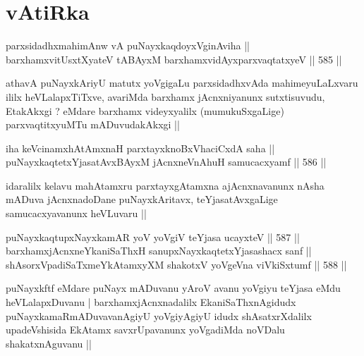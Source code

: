 \section*{vAtiRka}


\begin{shl}
parxsidadhxmahimAnw vA puNayxkaqdoyxVginAviha || \\
barxhamxvitUsxtXyateV tABAyxM barxhamxvidAyxparxvaqtatxyeV ||  585 ||  
\end{shl}

\begin{artha}
athavA puNayxkAriyU matutx yoVgigaLu parxsidadhxvAda mahimeyuLaLxvaru
ililx heVLalapxTiTxve, avariMda barxhamx jAcnxniyanunx sutxtisuvudu,
EtakAkxgi ? eMdare barxhamx videyxyalilx (mumukuSxgaLige)
parxvaqtitxyuMTu mADuvudakAkxgi ||
\end{artha}


\begin{shl}
iha keVcinamxhAtAmxnaH parxtayxknoBxVhaciCxdA saha || \\
puNayxkaqtetxYjasatAvxBAyxM jAcnxneVnA\s \s huH samucacxyamf ||  586 ||  
\end{shl}

\begin{artha}
idaralilx kelavu mahAtamxru parxtayxgAtamxna ajAcnxnavanunx nAsha
mADuva jAcnxnadoDane puNayxkAritavx, teYjasatAvxgaLige
samucacxyavanunx heVLuvaru ||
\end{artha}


\begin{shl}
puNayxkaqtupxNayxkamAR yoV yoVgiV teYjasa ucayxteV ||  587 ||  \\
barxhamxjAcnxneYkaniSaThxH sanupxNayxkaqtetxYjasashacx sanf || \\
shAsorxVpadiSaTxmeYkAtamxyXM shakotxV yoVgeVna viVkiSxtumf ||  588 ||  
\end{shl}

\begin{artha}
puNayxkftf eMdare puNayx mADuvanu yAroV avanu yoVgiyu teYjasa eMdu
heVLalapxDuvanu | barxhamxjAcnxnadalilx EkaniSaThxnAgidudx
puNayxkamaRmADuvavanAgiyU yoVgiyAgiyU idudx shAsatxrXdalilx
upadeVshisida EkAtamx savxrUpavanunx yoVgadiMda noVDalu
shakatxnAguvanu ||
\end{artha}

